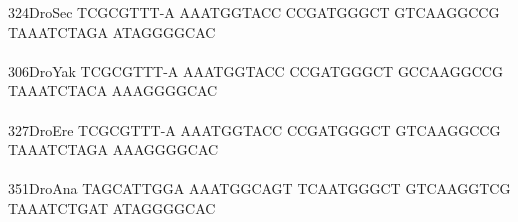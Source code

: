 \documentclass[11pt,twoside,reqno,a4paper]{article}
\begin{document}
{324\hspace*{1\charwidth}DroSec	TCGCGTTT-A	AAATGGTACC	CCGATGGGCT	GTCAAGGCCG	TAAATCTAGA	ATAGGGGCAC	\\
\hspace*{4\charwidth}\hspace*{7\charwidth}\hspace*{1\charwidth}\hspace*{1\charwidth}\hspace*{1\charwidth}\hspace*{1\charwidth}\hspace*{1\charwidth}\hspace*{1\charwidth}\\
306\hspace*{1\charwidth}DroYak	TCGCGTTT-A	AAATGGTACC	CCGATGGGCT	GCCAAGGCCG	TAAATCTACA	AAAGGGGCAC	\\
\hspace*{4\charwidth}\hspace*{7\charwidth}\hspace*{1\charwidth}\hspace*{1\charwidth}\hspace*{1\charwidth}\hspace*{1\charwidth}\hspace*{1\charwidth}\hspace*{1\charwidth}\\
327\hspace*{1\charwidth}DroEre	TCGCGTTT-A	AAATGGTACC	CCGATGGGCT	GTCAAGGCCG	TAAATCTAGA	AAAGGGGCAC	\\
\hspace*{4\charwidth}\hspace*{7\charwidth}\hspace*{1\charwidth}\hspace*{1\charwidth}\hspace*{1\charwidth}\hspace*{1\charwidth}\hspace*{1\charwidth}\hspace*{1\charwidth}\\
351\hspace*{1\charwidth}DroAna	TAGCATTGGA	AAATGGCAGT	TCAATGGGCT	GTCAAGGTCG	TAAATCTGAT	ATAGGGGCAC	\\
\hspace*{4\charwidth}\hspace*{7\charwidth}\hspace*{1\charwidth}\hspace*{1\charwidth}\hspace*{1\charwidth}\hspace*{1\charwidth}\hspace*{1\charwidth}\hspace*{1\charwidth}\\
}
\end{document}
